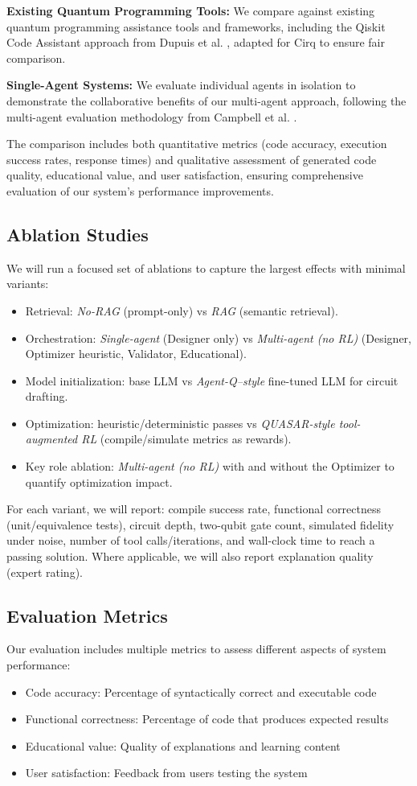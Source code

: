 \documentclass[runningheads]{llncs}
\begin{document}
\textbf{Existing Quantum Programming Tools:} We compare against existing quantum programming assistance tools and frameworks, including the Qiskit Code Assistant approach from Dupuis et al. \cite{10691762}, adapted for Cirq to ensure fair comparison.

\textbf{Single-Agent Systems:} We evaluate individual agents in isolation to demonstrate the collaborative benefits of our multi-agent approach, following the multi-agent evaluation methodology from Campbell et al. \cite{campbell2025enhancingllmbasedquantumcode}.

The comparison includes both quantitative metrics (code accuracy, execution success rates, response times) and qualitative assessment of generated code quality, educational value, and user satisfaction, ensuring comprehensive evaluation of our system's performance improvements.

\subsection{Ablation Studies}
We will run a focused set of ablations to capture the largest effects with minimal variants:
\begin{itemize}
\item Retrieval: \textit{No-RAG} (prompt-only) vs \textit{RAG} (semantic retrieval).
\item Orchestration: \textit{Single-agent} (Designer only) vs \textit{Multi-agent (no RL)} (Designer, Optimizer heuristic, Validator, Educational).
\item Model initialization: base LLM vs \textit{Agent-Q–style} fine-tuned LLM for circuit drafting.
\item Optimization: heuristic/deterministic passes vs \textit{QUASAR-style tool-augmented RL} (compile/simulate metrics as rewards).
\item Key role ablation: \textit{Multi-agent (no RL)} with and without the Optimizer to quantify optimization impact.
\end{itemize}

For each variant, we will report: compile success rate, functional correctness (unit/equivalence tests), circuit depth, two-qubit gate count, simulated fidelity under noise, number of tool calls/iterations, and wall-clock time to reach a passing solution. Where applicable, we will also report explanation quality (expert rating).

\subsection{Evaluation Metrics}
Our evaluation includes multiple metrics to assess different aspects of system performance:
\begin{itemize}
\item Code accuracy: Percentage of syntactically correct and executable code
\item Functional correctness: Percentage of code that produces expected results
\item Educational value: Quality of explanations and learning content
\item User satisfaction: Feedback from users testing the system
\end{itemize}
\end{document}
